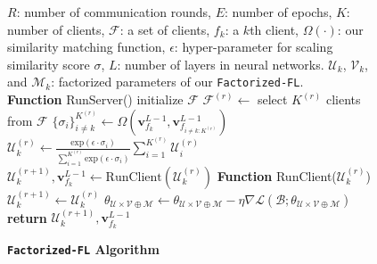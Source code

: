 \begin{figure*}[h!]
    \begin{minipage}[t]{.5\linewidth}
        \begin{algorithm}[H]
            \small
            \caption{\textbf{\texttt{Factorized-FL} Algorithm}}
        	\begin{algorithmic}[1]
        	    \label{algo:factorized_fl}
        	    \STATE  $R$: number of communication rounds, $E$: number of epochs, $K$: number of clients, $\mathcal{F}$: a set of clients, $f_k$: a $k$th client, $\Omega(\cdot)$: our similarity matching function, $\epsilon$: hyper-parameter for scaling similarity score $\sigma$, $L$: number of layers in neural networks. $\mathcal{U}_{k}$, $\mathcal{V}_{k}$, and $\mathcal{M}_{k}$: factorized parameters of our  \texttt{Factorized-FL}.\\
                \STATE   \textbf{Function} RunServer()
                    \STATE initialize $\mathcal{F} $
                        \STATE $\mathcal{F}^{(r)} \leftarrow$ select $K^{(r)}$ clients from $\mathcal{F}$
                                \STATE $\{\sigma_i \}_{i \neq k}^{K^{(r)}} \leftarrow \Omega(\textbf{v}_{f_k}^{L-1}, \textbf{v}_{f_{i\neq k:K^{(r)}}}^{L-1})$
                                \STATE $\mathcal{U}_{k}^{(r)} \leftarrow \frac{\text{exp}({\epsilon \cdot \sigma_i})}{\sum_{i=1}^{K^{(r)}} \text{exp}(\epsilon \cdot \sigma_i)} \sum_{i=1}^{K^{(r)}} \mathcal{U}_i^{(r)}$
                            \ENDIF 
                            \STATE $\mathcal{U}_k^{(r+1)}, \textbf{v}_{f_k}^{L-1}\leftarrow \text{RunClient} (\mathcal{U}_{k}^{(r)})$
                    	\ENDFOR
                    \ENDFOR 
                \STATE   \textbf{Function} RunClient($\mathcal{U}^{(r)}_k$)
                    \STATE $\mathcal{U}_{k}^{(r+1)} \leftarrow \mathcal{U}^{(r)}_k$  
                            \STATE $\theta_{\mathcal{U} \times \mathcal{V} \oplus \mathcal{M}} \leftarrow \theta_{\mathcal{U} \times \mathcal{V} \oplus \mathcal{M}}-\eta\nabla\mathcal{L}(\mathcal{B}; \theta_{\mathcal{U} \times \mathcal{V} \oplus \mathcal{M}})$
                        \ENDFOR
                    \ENDFOR
                    \STATE \textbf{return} $\mathcal{U}_{k}^{(r+1)}, \textbf{v}_{f_k}^{L-1}$

\end{algorithmic}
\end{algorithm}
\end{minipage}
\end{figure*}
